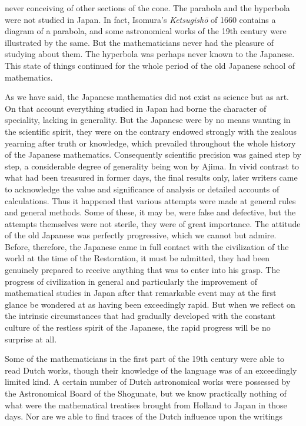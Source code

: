 \documentclass[11pt]{article}
\newcommand{\scanpage}[2]{\clearpage\setcounter{footnote}{0}\noindent{\footnotesize\color{gray}PDF page #1 · #2}\par\medskip}
\newcommand{\scanfooter}{}
\begin{document}
\scanpage{0191}{Chapter 22, printed page 177}
never conceiving of other sections of the cone. The parabola and the hyperbola were not studied in Japan. In fact, Isomura's \emph{Ketsugishō} of 1660 contains a diagram of a parabola, and some astronomical works of the 19th century were illustrated by the same. But the mathematicians never had the pleasure of studying about them. The hyperbola was perhaps never known to the Japanese. This state of things continued for the whole period of the old Japanese school of mathematics.

As we have said, the Japanese mathematics did not exist as science but as art. On that account everything studied in Japan had borne the character of speciality, lacking in generality. But the Japanese were by no means wanting in the scientific spirit, they were on the contrary endowed strongly with the zealous yearning after truth or knowledge, which prevailed throughout the whole history of the Japanese mathematics. Consequently scientific precision was gained step by step, a considerable degree of generality being won by Ajima. In vivid contrast to what had been treasured in former days, the final results only, later writers came to acknowledge the value and significance of analysis or detailed accounts of calculations. Thus it happened that various attempts were made at general rules and general methods. Some of these, it may be, were false and defective, but the attempts themselves were not sterile, they were of great importance. The attitude of the old Japanese was perfectly progressive, which we cannot but admire. Before, therefore, the Japanese came in full contact with the civilization of the world at the time of the Restoration, it must be admitted, they had been genuinely prepared to receive anything that was to enter into his grasp. The progress of civilization in general and particularly the improvement of mathematical studies in Japan after that remarkable event may at the first glance be wondered at as having been exceedingly rapid. But when we reflect on the intrinsic circumstances that had gradually developed with the constant culture of the restless spirit of the Japanese, the rapid progress will be no surprise at all.

Some of the mathematicians in the first part of the 19th century were able to read Dutch works, though their knowledge of the language was of an exceedingly limited kind. A certain number of Dutch astronomical works were possessed by the Astronomical Board of the Shogunate, but we know practically nothing of what were the mathematical treatises brought from Holland to Japan in those days. Nor are we able to find traces of the Dutch influence upon the writings
\scanfooter
\end{document}
